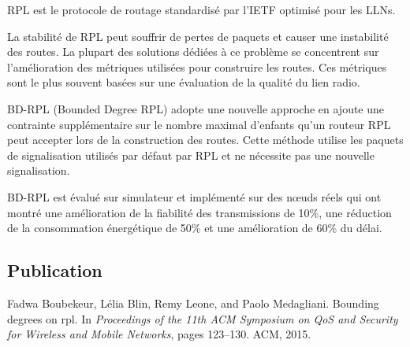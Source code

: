 \ac{RPL} est le protocole de routage standardisé par l'\ac{IETF} optimisé pour les \ac{LLN}s.

La stabilité de \ac{RPL} peut souffrir de pertes de paquets et causer une instabilité des routes.
La plupart des solutions dédiées à ce problème se concentrent sur l'amélioration des métriques utilisées pour construire les routes.
Ces métriques sont le plus souvent basées sur une évaluation de la qualité du lien radio.

BD-RPL (Bounded Degree RPL) adopte une nouvelle approche en ajoute une contrainte supplémentaire sur le nombre maximal d'enfants qu'un routeur \ac{RPL} peut accepter lors de la construction des routes.
Cette méthode utilise les paquets de signalisation utilisés par défaut par \ac{RPL} et ne nécessite pas une nouvelle signalisation.

BD-RPL est évalué sur simulateur et implémenté sur des nœuds réels qui ont montré une amélioration de la fiabilité des transmissions de 10\%, une réduction de la consommation énergétique de 50\% et une amélioration de 60\% du délai.

\subsection*{Publication}

Fadwa Boubekeur, L{\'e}lia Blin, Remy Leone, and Paolo Medagliani.
\newblock Bounding degrees on rpl.
\newblock In {\em Proceedings of the 11th ACM Symposium on QoS and Security for
  Wireless and Mobile Networks}, pages 123--130. ACM, 2015.



